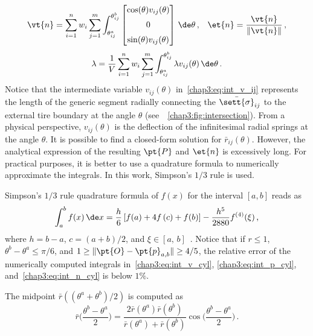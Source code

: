 %
\begin{equation}
  \vt{n} =
  \sum_{i=1}^{n}w_i\sum_{j=1}^{m} \displaystyle\int_{\theta^a_{ij}}^{\theta^b_{ij}}
  \begin{bmatrix}
    \cos(\theta)v_{ij}(\theta)
    \\[2mm]
    0
    \\[2mm]
    \sin(\theta)v_{ij}(\theta)
  \end{bmatrix} \, \de\theta \,\text{,} \quad
  \et{n} = \dfrac{\vt{n}}{\|\vt{n}\|}
  \,\text{,}
  \label{chap3:eq:int_n_cyl}
\end{equation}
%
\begin{equation}
  \lambda = \dfrac{1}{V} \sum_{i=1}^{n}w_i\sum_{j=1}^{m} \int_{\theta^a_{ij}}^{\theta^b_{ij}} \lambda v_{ij}(\theta) \, \de\theta
  \,\text{.}
  \label{chap3:eq:int_l_cyl}
\end{equation}
%
Notice that the intermediate variable $v_{ij}(\theta)$ in~\eqref{chap3:eq:int_v_ij} represents the length of the generic segment radially connecting the $\bar{\sett{\sigma}}_{ij}$ to the external tire boundary at the angle $\theta$ (see~\figurename{}~\ref{chap3:fig:intersection}). From a physical perspective, $v_{ij}(\theta)$ is the deflection of the infinitesimal radial springs at the angle $\theta$. It is possible to find a closed-form solution for $\bar{r}_{ij}(\theta)$. However, the analytical expression of the resulting $\pt{P}$ and $\et{n}$ is excessively long. For practical purposes, it is better to use a quadrature formula to numerically approximate the integrals. In this work, Simpson's $1/3$ rule is used.
%
\begin{remark}
  Simpson's $1/3$ rule quadrature formula of $f(x)$ for the interval $[a,b]$ reads as
  \begin{equation*}
    \int_{a}^b f(x)\,\de x = \dfrac{h}{6}\left[ f(a) + 4f\left(c\right)+f(b)\right] - \dfrac{h^5}{2880} f^{(4)}(\xi)
    \,\text{,}
  \end{equation*}
  where $h = b-a$, $c = (a+b)/2$, and $\xi \in [a, \, b]$~\cite{stoer2002introduction}. Notice that if $r \leq 1$, $\theta^b-\theta^a \leq \pi/6$, and $1 \geq \|\pt{O}-\pt{p}_{a,b}\| \geq 4/5$, the relative error of the numerically computed integrals in~\eqref{chap3:eq:int_v_cyl}, \eqref{chap3:eq:int_p_cyl}, and~\eqref{chap3:eq:int_n_cyl} is below $1\%$.
\end{remark}
%
\begin{remark}
  The midpoint $\bar{r}((\theta^a+\theta^b)/2)$ is computed as
  \begin{equation*}
    \bar{r}\bigg(\dfrac{\theta^b-\theta^a}{2}\bigg) = \dfrac{2\bar{r}(\theta^a)\bar{r}(\theta^b)}{\bar{r}(\theta^a)+\bar{r}(\theta^b)}\cos\bigg(\dfrac{\theta^b-\theta^a}{2}\bigg)
    \,\text{.}
  \end{equation*}
\end{remark}

